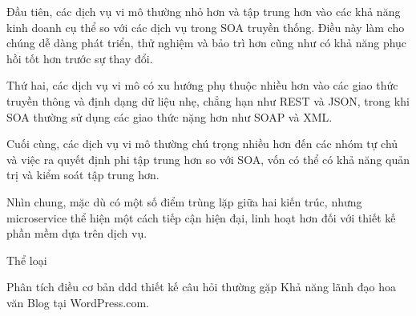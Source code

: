Đầu tiên, các dịch vụ vi mô thường nhỏ hơn và tập trung hơn vào các khả năng kinh doanh cụ thể so với các dịch vụ trong SOA truyền thống. Điều này làm cho chúng dễ dàng phát triển, thử nghiệm và bảo trì hơn cũng như có khả năng phục hồi tốt hơn trước sự thay đổi.

Thứ hai, các dịch vụ vi mô có xu hướng phụ thuộc nhiều hơn vào các giao thức truyền thông và định dạng dữ liệu nhẹ, chẳng hạn như REST và JSON, trong khi SOA thường sử dụng các giao thức nặng hơn như SOAP và XML.

Cuối cùng, các dịch vụ vi mô thường chú trọng nhiều hơn đến các nhóm tự chủ và việc ra quyết định phi tập trung hơn so với SOA, vốn có thể có khả năng quản trị và kiểm soát tập trung hơn.

Nhìn chung, mặc dù có một số điểm trùng lặp giữa hai kiến ​​trúc, nhưng microservice thể hiện một cách tiếp cận hiện đại, linh hoạt hơn đối với thiết kế phần mềm dựa trên dịch vụ.


Thể loại

Phân tích
điều cơ bản
ddd
thiết kế
câu hỏi thường gặp
Khả năng lãnh đạo
hoa văn
Blog tại WordPress.com.